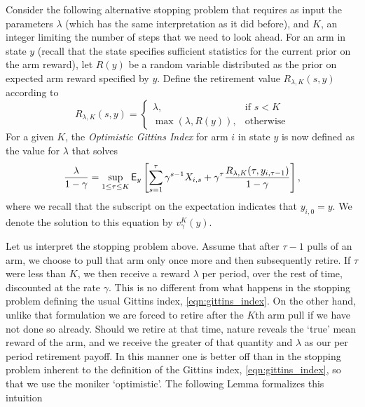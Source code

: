 Consider the following alternative stopping problem that requires as input the parameters $\lambda$ (which has the same interpretation as it did before), and $K$, an integer limiting the number of steps that we need to look ahead. For an arm in state $y$ (recall that the state specifies sufficient statistics for the current prior on the arm reward), let $R(y)$ be a random variable distributed as the prior on expected arm reward specified by $y$. Define the retirement value $R_{\lambda,K}(s,y)$ according to 
\[
R_{\lambda,K}(s, y) = 
\begin{cases}
\lambda ,& \text{if } s < K\\
\max\left(\lambda, R(y) \right), & \text{otherwise}
\end{cases}
\]
For a given $K$, the \emph{Optimistic Gittins Index} for arm $i$ in state $y$ is now defined as the value for $\lambda$ that solves
\begin{equation} \label{eqn:ogi_general}
\frac{ \lambda}{1-\gamma} = \sup_{1 \le \tau \leq K}
\mathsf{E}_y\left[
	\sum_{s=1}^{\tau} \gamma^{s-1}X_{i,s} + \gamma^{\tau} \frac{R_{\lambda,K}(\tau, y_{i,\tau-1})}{1-\gamma}
\right],
\end{equation}
where we recall that the subscript on the expectation indicates that $y_{i,0} = y$. 
We denote the solution to this equation by $v_\gamma^{K}(y)$.

Let us interpret the stopping problem above. {\color{blue}Assume that after $\tau - 1$ pulls of an arm, we choose to pull that arm only once more and then subsequently retire}. If $\tau$ were less than $K$, we then receive a reward $\lambda$ per period, over the rest of time, discounted at the rate $\gamma$. This is no different from what happens in the stopping problem defining the usual Gittins index, \eqref{eqn:gittins_index}. On the other hand, unlike that formulation we are forced to retire after the $K$th arm pull if we have not done so already. Should we retire at that time, nature reveals the `true' mean reward of the arm, and we receive the greater of that quantity and $\lambda$ as our per period retirement payoff. In this manner one is better off than in the stopping problem inherent to the definition of the Gittins index, \eqref{eqn:gittins_index}, so that we use the moniker `optimistic'.
The following Lemma formalizes this intuition

